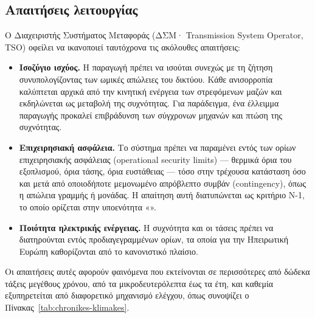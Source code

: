 

\subsection{Απαιτήσεις λειτουργίας}

Ο Διαχειριστής Συστήματος Μεταφοράς (ΔΣΜ· Transmission System Operator, TSO) οφείλει να
ικανοποιεί ταυτόχρονα τις ακόλουθες απαιτήσεις:

\begin{itemize}
\item \textbf{Ισοζύγιο ισχύος.} Η παραγωγή πρέπει να ισούται συνεχώς με τη ζήτηση συνυπολογίζοντας των ωμικές απώλειες του δικτύου. Κάθε ανισορροπία καλύπτεται αρχικά από την κινητική ενέργεια των στρεφόμενων μαζών και εκδηλώνεται ως μεταβολή της συχνότητας. Για παράδειγμα, ένα
      έλλειμμα παραγωγής προκαλεί επιβράδυνση των σύγχρονων μηχανών και πτώση της συχνότητας.
\item \textbf{Επιχειρησιακή ασφάλεια.} Το σύστημα πρέπει να παραμένει εντός των ορίων
      επιχειρησιακής ασφάλειας (operational security limits) — θερμικά όρια του
      εξοπλισμού, όρια τάσης, όρια ευστάθειας — τόσο στην τρέχουσα κατάσταση όσο και μετά
      από οποιοδήποτε μεμονωμένο απρόβλεπτο συμβάν (contingency), όπως η απώλεια γραμμής ή
      μονάδας. Η απαίτηση αυτή διατυπώνεται ως κριτήριο N-1, το οποίο ορίζεται στην υποενότητα
      «».
\item \textbf{Ποιότητα ηλεκτρικής ενέργειας.} Η συχνότητα και οι τάσεις πρέπει να
      διατηρούνται εντός προδιαγεγραμμένων ορίων, τα οποία για την Ηπειρωτική Ευρώπη
      καθορίζονται από το κανονιστικό πλαίσιο.
\end{itemize}

Οι απαιτήσεις αυτές αφορούν φαινόμενα που εκτείνονται σε περισσότερες από δώδεκα τάξεις
μεγέθους χρόνου, από τα μικροδευτερόλεπτα έως τα έτη, και καθεμία εξυπηρετείται από
διαφορετικό μηχανισμό ελέγχου, όπως συνοψίζει ο Πίνακας~\ref{tab:chronikes-klimakes}.

